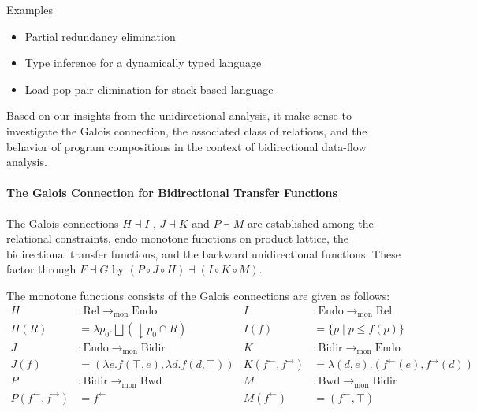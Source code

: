 \documentclass{llncs}
\newcommand{\Pow}{\mathcal{P}}
\newcommand{\Rel}{\mathrm{Rel}}
\newcommand{\Endo}{\mathrm{Endo}}
\newcommand{\Bidir}{\mathrm{Bidir}}
\newcommand{\Unidir}{\mathrm{Bwd}}
\newcommand{\tomon}{\to_{\mathrm{mon}}}
\newcommand{\ff}{{f^{\rightarrow}}}
\newcommand{\fb}{{f^{\leftarrow}}}
\newcommand{\bigjoin}{\bigsqcup}
\newcommand{\comp}{\circ}
\begin{document}
  Examples
  \begin{itemize}
    \item Partial redundancy elimination
    \item Type inference for a dynamically typed language
    \item Load-pop pair elimination for stack-based language
  \end{itemize}
  Based on our insights from the unidirectional analysis, it make sense to investigate the Galois connection, the associated class of relations, and the behavior of program compositions in the context of bidirectional data-flow analysis.

  \paragraph{The Galois Connection for Bidirectional Transfer Functions}
  The Galois connections $H \dashv I$ , $J \dashv K$ and $P \dashv M$ are established among the relational constraints, endo monotone functions on product lattice, the bidirectional transfer functions, and the backward unidirectional functions. These factor through $F \dashv G$ by $(P \comp J \comp H) \dashv (I \comp K \comp M)$.
  \begin{center}
  \end{center}
  The monotone functions consists of the Galois connections are given as follows:
  \begin{align*}
    H &: \Rel \tomon \Endo &
    I &: \Endo \tomon \Rel \\
    H(R) &= \lambda p_{0} . \bigjoin (\downarrow p_{0} \cap R) &
    I(f) &= \{p \mid p \leq f(p)\} \\
    J &: \Endo \tomon \Bidir &
    K &: \Bidir \tomon \Endo \\
    J(f) &= (\lambda e . f (\top , e ) , \lambda d . f (d , \top)) &
    K(\fb , \ff) &= \lambda (d , e) . (\fb(e) , \ff(d)) \\
    P &: \Bidir \tomon \Unidir &
    M &: \Unidir \tomon \Bidir \\
    P(\fb , \ff) &= \fb &
    M(\fb) &= (\fb , \top)
  \end{align*}
\end{document}
